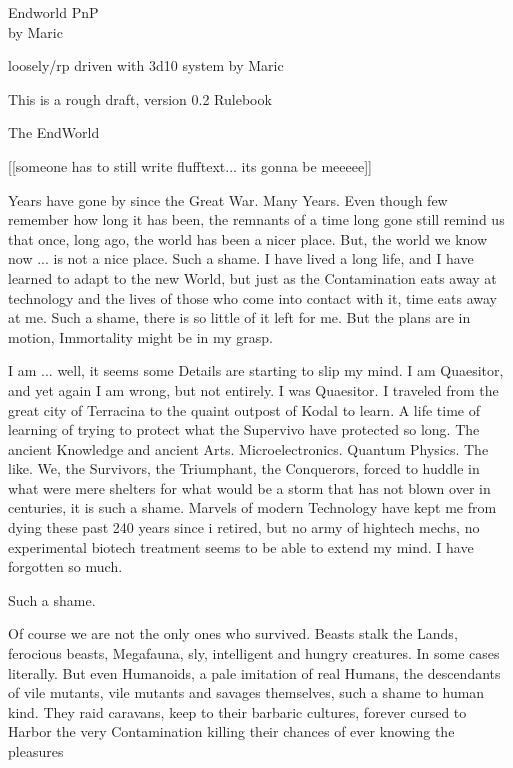 \documentclass{article}
\newcommand{\headline}[1]{\begin{center}\Large #1 \normalsize \end{center}}
\begin{document}
    \begin{center}\huge
    Endworld PnP\\\large by Maric\\\normalsize \end{center}
    loosely/rp driven with 3d10 system by Maric

    This is a rough draft, version 0.2 Rulebook
    \headline{The EndWorld}

    [[someone has to still write flufftext... its gonna be meeeee]]


    Years have gone by since the Great War. Many Years. Even though few remember how long it has been, the remnants
    of a time long gone still remind us that once, long ago, the world has been a nicer place. But, the world we know
    now ... is not a nice place. Such a shame. I have lived a long life, and I have learned to adapt to the new World,
    but just as the Contamination eats away at technology and the lives of those who come into contact with it, time
    eats away at me. Such a shame, there is so little of it left for me. But the plans are in motion, Immortality might
    be in my grasp.\par
    I am ... well, it seems some Details are starting to slip my mind. I am Quaesitor, and yet again I am wrong, but
    not entirely. I was Quaesitor. I traveled from the great city of Terracina to the quaint outpost of Kodal to
    learn. A life time of learning of trying to protect what the Supervivo have protected so long. The ancient Knowledge
    and ancient Arts. Microelectronics. Quantum Physics. The like. We, the Survivors, the Triumphant, the Conquerors,
    forced to huddle in what were mere shelters for what would be a storm that has not blown over in centuries, it is such
    a shame. Marvels of modern Technology have kept me from dying these past 240 years since i retired, but no army of
    hightech mechs, no experimental biotech treatment seems to be able to extend my mind. I have forgotten so much.
    \par Such a shame.\par
    Of course we are not the only ones who survived. Beasts stalk the Lands, ferocious beasts, Megafauna, sly, intelligent
    and hungry creatures. In some cases literally. But even Humanoids, a pale imitation of real Humans, the descendants
    of vile mutants, vile mutants and savages themselves, such a shame to human kind. They raid caravans, keep to their
    barbaric cultures, forever cursed to Harbor the very Contamination killing their chances of ever knowing the pleasures
\end{document}

